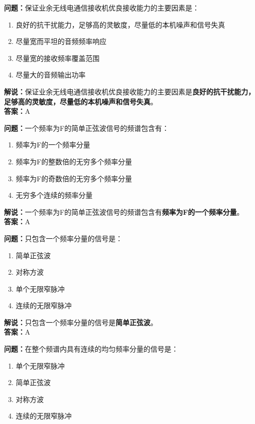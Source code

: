 \textbf{问题：}保证业余无线电通信接收机优良接收能力的主要因素是：

\begin{enumerate}[label=\Alph*), leftmargin=1cm]
	\item 良好的抗干扰能力，足够高的灵敏度，尽量低的本机噪声和信号失真
	\item 尽量宽而平坦的音频频率响应
	\item 尽量宽的接收频率覆盖范围
	\item 尽量大的音频输出功率
\end{enumerate}

\textbf{解说：}保证业余无线电通信接收机优良接收能力的主要因素是\textbf{良好的抗干扰能力，足够高的灵敏度，尽量低的本机噪声和信号失真}。\\\textbf{答案：}A%



\textbf{问题：}一个频率为F的简单正弦波信号的频谱包含有：

\begin{enumerate}[label=\Alph*), leftmargin=1cm]
	\item 频率为F的一个频率分量
	\item 频率为F的整数倍的无穷多个频率分量
	\item 频率为F的奇数倍的无穷多个频率分量
	\item 无穷多个连续的频率分量
\end{enumerate}

\textbf{解说：}一个频率为F的简单正弦波信号的频谱包含有\textbf{频率为F的一个频率分量}。\\\textbf{答案：}A%



\textbf{问题：}只包含一个频率分量的信号是：
\begin{enumerate}[label=\Alph*), leftmargin=1cm]
	\item 简单正弦波
	\item 对称方波
	\item 单个无限窄脉冲
	\item 连续的无限窄脉冲
\end{enumerate}

\textbf{解说：}只包含一个频率分量的信号是\textbf{简单正弦波}。\\\textbf{答案：}A%



\textbf{问题：}在整个频谱内具有连续的均匀频率分量的信号是：

\begin{enumerate}[label=\Alph*), leftmargin=1cm]
	\item 单个无限窄脉冲
	\item 简单正弦波
	\item 对称方波
	\item 连续的无限窄脉冲
\end{enumerate}

